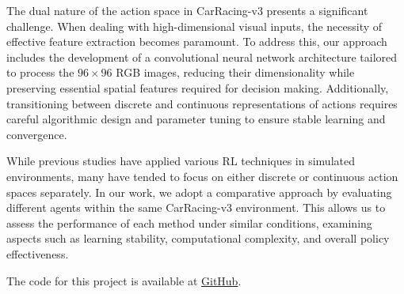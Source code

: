 \documentclass[../CSC_52081_EP.tex]{subfiles}
\begin{document}
The dual nature of the action space in CarRacing-v3 presents a significant challenge. When dealing with high-dimensional visual inputs, the necessity of effective feature extraction becomes paramount. To address this, our approach includes the development of a convolutional neural network architecture tailored to process the \(96\times96\) RGB images, reducing their dimensionality while preserving essential spatial features required for decision making. Additionally, transitioning between discrete and continuous representations of actions requires careful algorithmic design and parameter tuning to ensure stable learning and convergence.

While previous studies have applied various RL techniques in simulated environments, many have tended to focus on either discrete or continuous action spaces separately. In our work, we adopt a comparative approach by evaluating different agents within the same CarRacing-v3 environment. This allows us to assess the performance of each method under similar conditions, examining aspects such as learning stability, computational complexity, and overall policy effectiveness.

The code for this project is available at \href{https://github.com/tr0fin0/ensta_CSC_52081_EP_project}{GitHub}.
\end{document}
